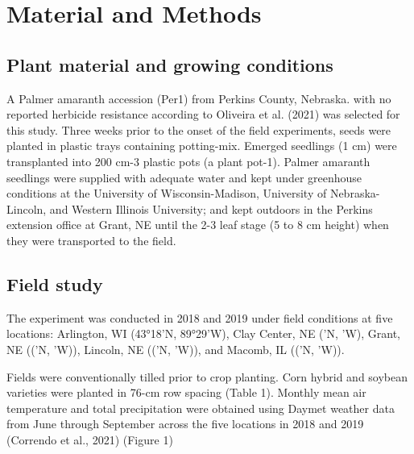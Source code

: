 \documentclass[utf8]{frontiersSCNS}
\begin{document}
\hypertarget{material-and-methods}{%
\section*{Material and Methods}\label{material-and-methods}}

\hypertarget{plant-material-and-growing-conditions}{%
\subsection*{Plant material and growing
conditions}\label{plant-material-and-growing-conditions}}

A Palmer amaranth accession (Per1) from Perkins County, Nebraska. with
no reported herbicide resistance according to Oliveira et al. (2021) was
selected for this study. Three weeks prior to the onset of the field
experiments, seeds were planted in plastic trays containing potting-mix.
Emerged seedlings (1 cm) were transplanted into 200 cm-3 plastic pots (a
plant pot-1). Palmer amaranth seedlings were supplied with adequate
water and kept under greenhouse conditions at the University of
Wisconsin-Madison, University of Nebraska-Lincoln, and Western Illinois
University; and kept outdoors in the Perkins extension office at Grant,
NE until the 2-3 leaf stage (5 to 8 cm height) when they were
transported to the field.

\hypertarget{field-study}{%
\subsection*{Field study}\label{field-study}}

The experiment was conducted in 2018 and 2019 under field conditions at
five locations: Arlington, WI (43°18'N, 89°29'W), Clay Center, NE ('N,
'W), Grant, NE (('N, 'W)), Lincoln, NE (('N, 'W)), and Macomb, IL (('N,
'W)).

Fields were conventionally tilled prior to crop planting. Corn hybrid
and soybean varieties were planted in 76-cm row spacing (Table 1).
Monthly mean air temperature and total precipitation were obtained using
Daymet weather data from June through September across the five
locations in 2018 and 2019 (Correndo et al., 2021) (Figure 1)
\end{document}
